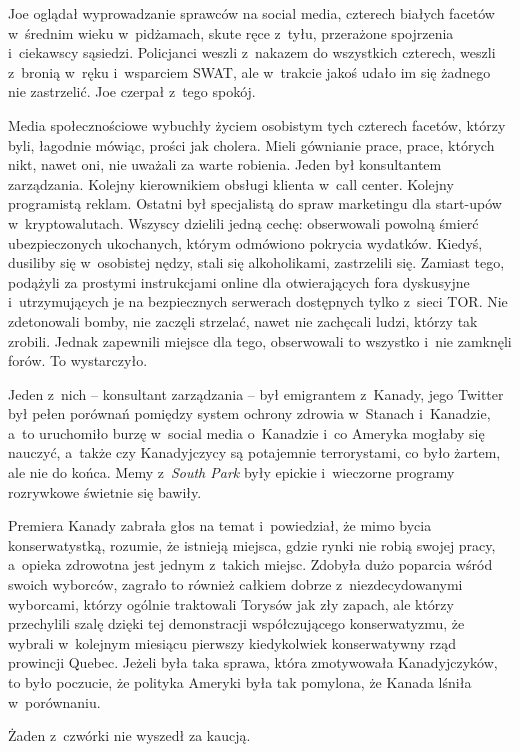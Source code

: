 \documentclass[oneside,polish,11pt,sfheadings]{mwbk}
\begin{document}
Joe oglądał wyprowadzanie sprawców na social media, czterech białych
facetów w~średnim wieku w~pidżamach, skute ręce z~tyłu, przerażone
spojrzenia i~ciekawscy sąsiedzi. Policjanci weszli z~nakazem do
wszystkich czterech, weszli z~bronią w~ręku i~wsparciem SWAT, ale w~trakcie jakoś udało im się żadnego nie zastrzelić. Joe czerpał z~tego
spokój.

Media społecznościowe wybuchły życiem osobistym tych czterech facetów,
którzy byli, łagodnie mówiąc, prości jak cholera. Mieli gównianie prace,
prace, których nikt, nawet oni, nie uważali za warte robienia. Jeden był
konsultantem zarządzania. Kolejny kierownikiem obsługi klienta w~call
center. Kolejny programistą reklam. Ostatni był specjalistą do spraw
marketingu dla start-upów w~kryptowalutach. Wszyscy dzielili jedną
cechę: obserwowali powolną śmierć ubezpieczonych ukochanych, którym
odmówiono pokrycia wydatków. Kiedyś, dusiliby się w~osobistej nędzy,
stali się alkoholikami, zastrzelili się. Zamiast tego, podążyli za
prostymi instrukcjami online dla otwierających fora dyskusyjne i~utrzymujących je na bezpiecznych serwerach dostępnych tylko z~sieci TOR.
Nie zdetonowali bomby, nie zaczęli strzelać, nawet nie zachęcali ludzi,
którzy tak zrobili. Jednak zapewnili miejsce dla tego, obserwowali to
wszystko i~nie zamknęli forów. To wystarczyło.

Jeden z~nich -- konsultant zarządzania -- był emigrantem z~Kanady, jego
Twitter był pełen porównań pomiędzy system ochrony zdrowia w~Stanach i~Kanadzie, a~to uruchomiło burzę w~social media o~Kanadzie i~co Ameryka
mogłaby się nauczyć, a~także czy Kanadyjczycy są potajemnie
terrorystami, co było żartem, ale nie do końca. Memy z~\textit{South Park}
były epickie i~wieczorne programy rozrywkowe świetnie się bawiły.

Premiera Kanady zabrała głos na temat i~powiedział, że mimo bycia
konserwatystką, rozumie, że istnieją miejsca, gdzie rynki nie robią
swojej pracy, a~opieka zdrowotna jest jednym z~takich miejsc. Zdobyła
dużo poparcia wśród swoich wyborców, zagrało to również całkiem dobrze z~niezdecydowanymi wyborcami, którzy ogólnie traktowali Torysów jak zły
zapach, ale którzy przechylili szalę dzięki tej demonstracji
współczującego konserwatyzmu, że wybrali w~kolejnym miesiącu pierwszy
kiedykolwiek konserwatywny rząd prowincji Quebec. Jeżeli była taka
sprawa, która zmotywowała Kanadyjczyków, to było poczucie, że polityka
Ameryki była tak pomylona, że Kanada lśniła w~porównaniu.

Żaden z~czwórki nie wyszedł za kaucją.
\end{document}

